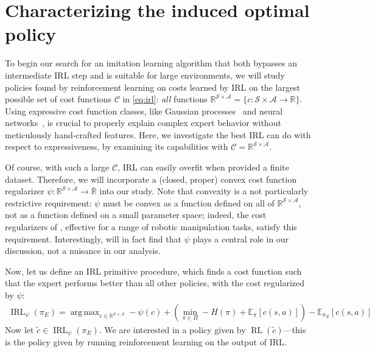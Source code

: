 \documentclass{article}
\newcommand\bbR{\ensuremath{\mathbb{R}}} %
\newcommand\bbE{\ensuremath{\mathbb{E}}} %
\newcommand\extR{\ensuremath{\overline{\mathbb{R}}}}
\newcommand\allC{\ensuremath{\mathbb{R}^{\mathcal{S}\times\mathcal{A}}}}
\DeclareMathOperator*{\argmax}{arg\,max}
\newcommand{\1}{\mathbb{I}} %
\DeclareMathOperator{\rl}{RL}
\DeclareMathOperator{\irl}{IRL} %
\begin{document}

\section{Characterizing the induced optimal policy}
\label{sec:characterizing}
To begin our search for an imitation learning algorithm that both bypasses an intermediate IRL step and is suitable for large environments, we will study policies found by reinforcement learning on costs learned by IRL on the largest possible set of cost functions $\mathcal{C}$ in \cref{eq:irl}: \emph{all} functions $\allC = \{c : \mathcal{S}\times\mathcal{A}\rightarrow\bbR \}$.
Using expressive cost function classes, like Gaussian processes~\citep{levine2011nonlinear} and neural networks~\citep{finn2016guided}, is crucial to properly explain complex expert behavior without meticulously hand-crafted features.
Here, we investigate the best IRL can do with respect to expressiveness, by examining its capabilities with  $\mathcal{C} = \allC$.

Of course, with such a large $\mathcal{C}$, IRL can easily overfit when provided a finite dataset.
Therefore, we will incorporate a (closed, proper) convex cost function regularizer $\psi : \allC \rightarrow \extR$ into our study.
Note that convexity is a not particularly restrictive requirement: $\psi$ must be convex as a function defined on all of $\allC$, not as a function defined on a small parameter space; indeed, the cost regularizers of \citet{finn2016guided}, effective for a range of robotic manipulation tasks, satisfy this requirement.
Interestingly, will in fact find that $\psi$ plays a central role in our discussion, not a nuisance in our analysis.

Now, let us define an IRL primitive procedure, which finds a cost function such that the expert performs better than all other policies, with the cost regularized by $\psi$:
\begin{align}
\irl_\psi (\pi_E) = \argmax_{c\in\allC} -\psi(c) + \left(\min_{\pi\in\Pi} -H(\pi) + \bbE_{\pi} [c(s,a)]\right) - \bbE_{\pi_E} [c(s,a)]
\end{align}
Now let $\tilde c \in \irl_\psi(\pi_E)$. We are interested in a policy given by $\rl(\tilde c)$---this is the policy given by running reinforcement learning on the output of IRL.
\end{document}
